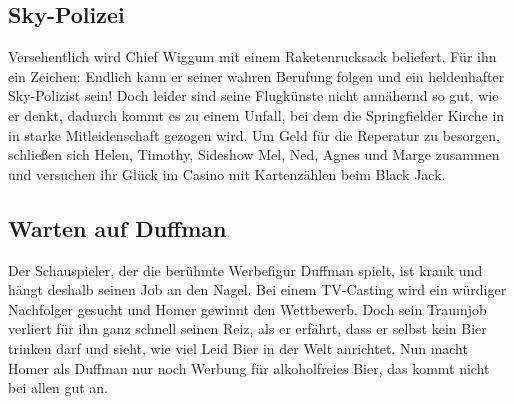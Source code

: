 
\subsection{Sky-Polizei}\label{TABF09}
Versehentlich wird Chief Wiggum mit einem Raketenrucksack beliefert. Für ihn ein Zeichen: Endlich kann er seiner wahren Berufung folgen und ein heldenhafter Sky-Polizist sein! Doch leider sind seine Flugkünste nicht annähernd so gut, wie er denkt, dadurch kommt es zu einem Unfall, bei dem die Springfielder Kirche in in starke Mitleidenschaft gezogen wird. Um Geld für die Reperatur zu besorgen, schließen sich Helen, Timothy, Sideshow Mel, Ned, Agnes und Marge zusammen und versuchen ihr Glück im Casino mit Kartenzählen beim Black Jack.


\subsection{Warten auf Duffman}\label{TABF10}
Der Schauspieler, der die berühmte Werbefigur Duffman spielt, ist krank und hängt deshalb seinen Job an den Nagel. Bei einem TV-Casting wird ein würdiger Nachfolger gesucht und Homer gewinnt den Wettbewerb. Doch sein Traumjob verliert für ihn ganz schnell seinen Reiz, als er erfährt, dass er selbst kein Bier trinken darf und sieht, wie viel Leid Bier in der Welt anrichtet. Nun macht Homer als Duffman nur noch Werbung für alkoholfreies Bier, das kommt nicht bei allen gut an.


